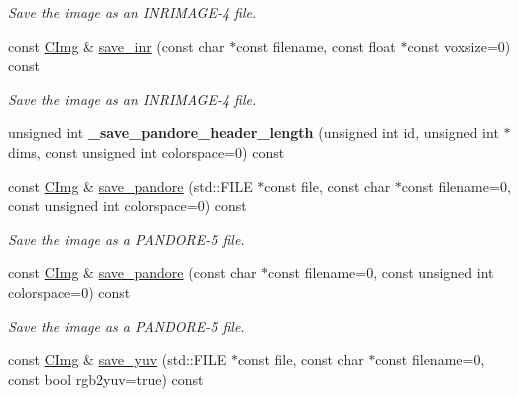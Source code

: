 \begin{DoxyCompactItemize}
\begin{DoxyCompactList}\small\item\em Save the image as an I\-N\-R\-I\-M\-A\-G\-E-\/4 file. \end{DoxyCompactList}\item 
\hypertarget{structcimg__library_1_1_c_img_ab60873719770da4eb9724711d997d5b3}{const \hyperlink{structcimg__library_1_1_c_img}{C\-Img} \& \hyperlink{structcimg__library_1_1_c_img_ab60873719770da4eb9724711d997d5b3}{save\-\_\-inr} (const char $\ast$const filename, const float $\ast$const voxsize=0) const }\label{structcimg__library_1_1_c_img_ab60873719770da4eb9724711d997d5b3}

\begin{DoxyCompactList}\small\item\em Save the image as an I\-N\-R\-I\-M\-A\-G\-E-\/4 file. \end{DoxyCompactList}\item 
\hypertarget{structcimg__library_1_1_c_img_ada5e3c699b9b9fe4907c42ab6a4e2c85}{unsigned int {\bfseries \-\_\-save\-\_\-pandore\-\_\-header\-\_\-length} (unsigned int id, unsigned int $\ast$dims, const unsigned int colorspace=0) const }\label{structcimg__library_1_1_c_img_ada5e3c699b9b9fe4907c42ab6a4e2c85}

\item 
\hypertarget{structcimg__library_1_1_c_img_a7930700a82a0939576a91e6c4cf6c248}{const \hyperlink{structcimg__library_1_1_c_img}{C\-Img} \& \hyperlink{structcimg__library_1_1_c_img_a7930700a82a0939576a91e6c4cf6c248}{save\-\_\-pandore} (std\-::\-F\-I\-L\-E $\ast$const file, const char $\ast$const filename=0, const unsigned int colorspace=0) const }\label{structcimg__library_1_1_c_img_a7930700a82a0939576a91e6c4cf6c248}

\begin{DoxyCompactList}\small\item\em Save the image as a P\-A\-N\-D\-O\-R\-E-\/5 file. \end{DoxyCompactList}\item 
\hypertarget{structcimg__library_1_1_c_img_a8e17508503ac53b2fa7ace2d216bffe5}{const \hyperlink{structcimg__library_1_1_c_img}{C\-Img} \& \hyperlink{structcimg__library_1_1_c_img_a8e17508503ac53b2fa7ace2d216bffe5}{save\-\_\-pandore} (const char $\ast$const filename=0, const unsigned int colorspace=0) const }\label{structcimg__library_1_1_c_img_a8e17508503ac53b2fa7ace2d216bffe5}

\begin{DoxyCompactList}\small\item\em Save the image as a P\-A\-N\-D\-O\-R\-E-\/5 file. \end{DoxyCompactList}\item 
\hypertarget{structcimg__library_1_1_c_img_a90f48e7931d33b70a970ba4a93b02c62}{const \hyperlink{structcimg__library_1_1_c_img}{C\-Img} \& \hyperlink{structcimg__library_1_1_c_img_a90f48e7931d33b70a970ba4a93b02c62}{save\-\_\-yuv} (std\-::\-F\-I\-L\-E $\ast$const file, const char $\ast$const filename=0, const bool rgb2yuv=true) const }\label{structcimg__library_1_1_c_img_a90f48e7931d33b70a970ba4a93b02c62}


\end{DoxyCompactItemize}
